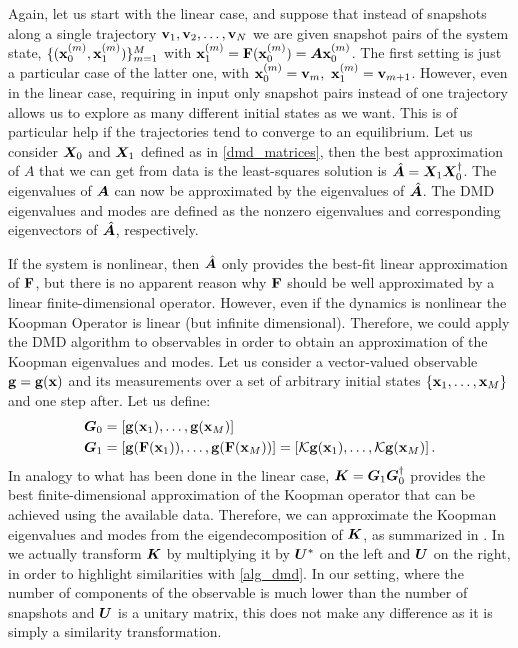 Again, let us start with the linear case, and suppose that instead of snapshots along a single trajectory $\vb{v}_1, \vb{v}_2, \dots, \vb{v}_N$ we are given snapshot pairs of the system state, $\{(\vb{x}_0^{(m)}, \vb{x}_1^{(m)})\}_{m = 1}^M$ with $\vb{x}_1^{(m)} = \vb{F}(\vb{x}_0^{(m)}) = \vb*{A}\vb{x}_0^{(m)}$. The first setting is just a particular case of the latter one, with $\vb{x}_0^{(m)} = \vb{v}_m,\,\,\vb{x}_1^{(m)} = \vb{v}_{m+1}$. However, even in the linear case, requiring in input only snapshot pairs instead of one trajectory allows us to explore as many different initial states as we want. This is of particular help if the trajectories tend to converge to an equilibrium. Let us consider $\vb*{X}_0$ and $\vb*{X}_1$ defined as in \eqref{dmd_matrices}, then the best approximation of $A$ that we can get from data is the least-squares solution is $\hat{\vb*{A}} = \vb*{X}_1\vb*{X}_0^{\dagger}$. The eigenvalues of $\vb*{A}$ can now be approximated by the eigenvalues of $\hat{\vb*{A}}$. The DMD eigenvalues and modes are defined as the nonzero eigenvalues and corresponding eigenvectors of $\hat{\vb*{A}}$, respectively.

If the system is nonlinear, then $\hat{\vb*{A}}$ only provides the best-fit linear approximation of $\vb{F}$, but there is no apparent reason why $\vb{F}$ should be well approximated by a linear finite-dimensional operator. However, even if the dynamics is nonlinear the Koopman Operator is linear (but infinite dimensional). Therefore, we could apply the DMD algorithm to observables in order to obtain an approximation of the Koopman eigenvalues and modes. Let us consider a vector-valued observable $\vb{g} = \vb{g}(\vb{x})$ and its measurements over a set of arbitrary initial states $\{\vb{x}_1,\dots, \vb{x}_M\}$ and one step after. Let us define:
\begin{equation}
    \label{dmd_koopman_matrices}
    \begin{split}
        \vb*{G}_0 &= \left[\vb{g}(\vb{x}_1), \dots, \vb{g}(\vb{x}_M)\right] \\
        \vb*{G}_1 &= \left[\vb{g}(\vb{F}(\vb{x}_1)), \dots, \vb{g}(\vb{F}(\vb{x}_M))\right] = \left[\mathcal{K}\vb{g}(\vb{x}_1), \dots, \mathcal{K}\vb{g}(\vb{x}_M)\right].\\
    \end{split}
\end{equation}
In analogy to what has been done in the linear case, $\vb*{K} = \vb*{G}_1\vb*{G}_0^{\dagger}$ provides the best finite-dimensional approximation of the Koopman operator that can be achieved using the available data. Therefore, we can approximate the Koopman eigenvalues and modes from the eigendecomposition of $\vb*{K}$, as summarized in . In  we actually transform $\vb*{K}$ by multiplying it by $\vb*{U}^*$ on the left and $\vb*{U}$ on the right, in order to highlight similarities with \cref{alg_dmd}. In our setting, where the number of components of the observable is much lower than the number of snapshots and $\vb*{U}$ is a unitary matrix, this does not make any difference as it is simply a similarity transformation.

